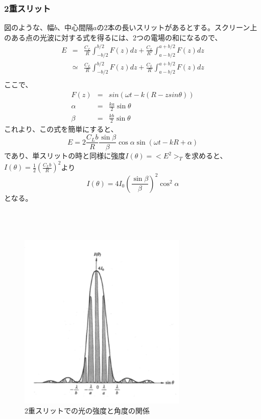 \documentclass[10pt]{ujarticle}
\begin{document}
\subsubsection{2重スリット}
図のような、幅$b$、中心間隔$a$の2本の長いスリットがあるとする。スクリーン上のある点の光波に対する式を得るには、2つの電場の和になるので、
\begin{eqnarray*}
E &=& \frac{C_L}{R} \int_{-b/2}^{b/2} F(z) dz + \frac{C_L}{R'} \int_{a-b/2}^{a+b/2} F(z) dz \\
&\simeq& \frac{C_L}{R} \int_{-b/2}^{b/2} F(z) dz + \frac{C_L}{R} \int_{a-b/2}^{a+b/2} F(z) dz \\ 
\end{eqnarray*}
ここで、
\begin{eqnarray*}
F(z) &=& sin(\omega t - k(R-zsin\theta)) \\
\alpha &=& \frac{ka}{2} \sin\theta \\
\beta &=& \frac{kb}{2} \sin\theta
\end{eqnarray*}
これより、この式を簡単にすると、
\[
E = 2 \frac{C_L b}{R} \frac{\sin\beta}{\beta} \cos\alpha \sin(\omega t -kR + \alpha)
\]
であり、単スリットの時と同様に強度$I(\theta) = <E^2>_T$を求めると、$I(\theta) = \frac{1}{2} (\frac{C_L b}{R})^2$より
\[
I(\theta) = 4I_0 (\frac{\sin \beta}{\beta})^2 \cos^2 \alpha
\]
となる。\\
\\
\\
\\
\begin{figure}[h]
\begin{center}
\includegraphics[width=8cm, bb = 0 0 400 300]{SummerChallenge_2slits.png}
\caption{2重スリットでの光の強度と角度の関係}
\end{center}
\end{figure}
\end{document}
